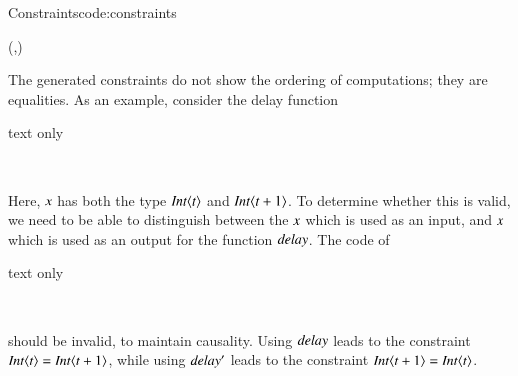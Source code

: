 \begin{texexptitled}{Constraints}{code:constraints}
\begin{hscode}\SaveRestoreHook
{}%
%
\>[B]{}\;\;\mathrel{=}(\;,\;){}\<[E]%
\ColumnHook
\end{hscode}\resethooks
\end{texexptitled}

The generated constraints do not show the ordering of computations; they are equalities.
As an example, consider the delay function 
\begin{changemargin}{1cm}{0cm}
\begin{expansionno}{text only}\begin{hscode}\SaveRestoreHook
{}%
%
\>[B]{}\mathbin{::}\langle{}\rangle\to {}\langle{}\mathbin{+}\rangle{}\<[E]%
\\
\>[B]{}\;\mathrel{=}\<[E]%
\ColumnHook
\end{hscode}\resethooks
\end{expansionno}
\end{changemargin}
Here, \ensuremath{\Varid{x}} has both the type \ensuremath{\Conid{Int}\langle\Varid{t}\rangle} and \ensuremath{\Conid{Int}\langle\Varid{t}\mathbin{+}\mathrm{1}\rangle}.
To determine whether this is valid, we need to be able to distinguish between the \ensuremath{\Varid{x}} which is used as an input, and \ensuremath{\Varid{x}} which is used as an output for the function \ensuremath{\Varid{delay}}.
The code of 
\begin{changemargin}{1cm}{0cm}
\begin{expansionno}{text only}\begin{hscode}\SaveRestoreHook
{}%
%
\>[B]{}\mathbin{::}\langle{}\mathbin{+}\rangle\to {}\langle{}\rangle{}\<[E]%
\\
\>[B]{}\;\mathrel{=}\<[E]%
\ColumnHook
\end{hscode}\resethooks
\end{expansionno}
\end{changemargin}
should be invalid, to maintain causality.
Using \ensuremath{\Varid{delay}} leads to the constraint \ensuremath{\Conid{Int}\langle\Varid{t}\rangle\mathrel{=}\Conid{Int}\langle\Varid{t}\mathbin{+}\mathrm{1}\rangle}, while using \ensuremath{\Varid{delay'}} leads to the constraint \ensuremath{\Conid{Int}\langle\Varid{t}\mathbin{+}\mathrm{1}\rangle\mathrel{=}\Conid{Int}\langle\Varid{t}\rangle}.
